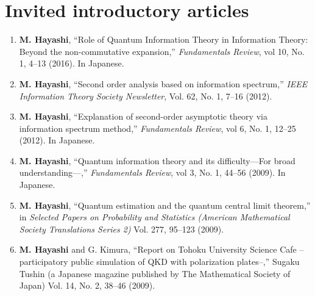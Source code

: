 \documentclass[a4paper,12pt,oneside]{article}
\begin{document}
\section{Invited introductory articles}
\begin{enumerate}
\item 
\textbf{M. Hayashi},
``Role of Quantum Information Theory in Information Theory:
Beyond the non-commutative expansion,''
{\em Fundamentals Review}, vol 10, No. 1,  4--13 (2016). 
In Japanese. 


\item 
\textbf{M. Hayashi}, ``Second order analysis based on information spectrum,'' 
{\em IEEE Information Theory Society Newsletter}, Vol. 62, No. 1, 7--16 (2012). 

\item 
\textbf{M. Hayashi},
``Explanation of second-order asymptotic theory via information spectrum method,''
{\em Fundamentals Review}, vol 6, No. 1, 12--25 (2012). 
In Japanese. 

\item 
\textbf{M. Hayashi},
``Quantum information theory and its difficulty---For broad understanding---,''
{\em Fundamentals Review}, vol 3, No. 1, 44--56 (2009). 
In Japanese. 

\item 
\textbf{M. Hayashi}, 
``Quantum estimation and the quantum central limit theorem,'' 
in 
{\em Selected Papers on Probability and Statistics (American Mathematical Society Translations Series 2)} Vol. 277, 95--123 (2009). 

\item 
\textbf{M. Hayashi} and G. Kimura,
``Report on Tohoku University Science Cafe -- 
participatory public simulation of QKD with polarization plates--,'' 
Sugaku Tushin (a Japanese magazine published by The Mathematical Society of Japan)
Vol. 14, No. 2, 38--46 (2009).

\end{enumerate}
\end{document}
